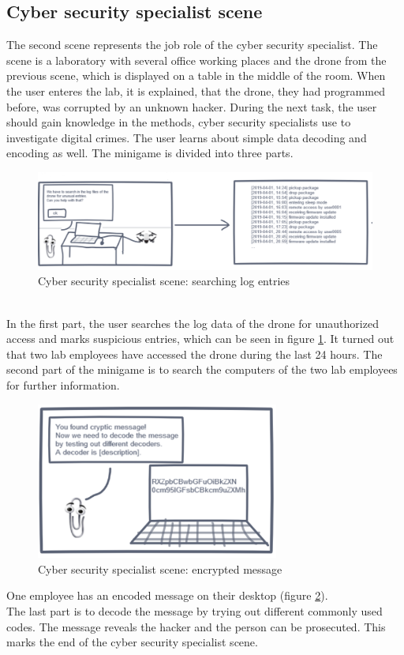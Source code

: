 \subsection{Cyber security specialist scene}
The second scene represents the job role of the cyber security specialist. The scene is a laboratory with several office working places and the drone from the previous scene, which is displayed on a table in the middle of the room. When the user enteres the lab, it is explained, that the drone, they had programmed before, was corrupted by an unknown hacker. During the next task, the user should gain knowledge in the methods, cyber security specialists use to investigate digital crimes. The user learns about simple data decoding and encoding as well. The minigame is divided into three parts. 
\begin{figure}[h!]
  \includegraphics[width=16cm]{kapitel/storyboard/cyber-analyst1.PNG}
  \centering
  \caption{Cyber security specialist scene: searching log entries}
  \label{fig:logscene}
\end{figure}
\\In the first part, the user searches the log data of the drone for unauthorized access and marks suspicious entries, which can be seen in figure \ref{fig:logscene}. It turned out that two lab employees have accessed the drone during the last 24 hours. The second part of the minigame is to search the computers of the two lab employees for further information. 
\begin{figure}[h!]
  \includegraphics[width=8cm]{kapitel/storyboard/cyber-analyst3.PNG}
  \centering
  \caption{Cyber security specialist scene: encrypted message}
  \label{fig:logscene2}
\end{figure}
One employee has an encoded message on their desktop (figure \ref{fig:logscene2}).\\ The last part is to decode the message by trying out different commonly used codes. The message reveals the hacker and the person can be prosecuted. This marks the end of the cyber security specialist scene.

